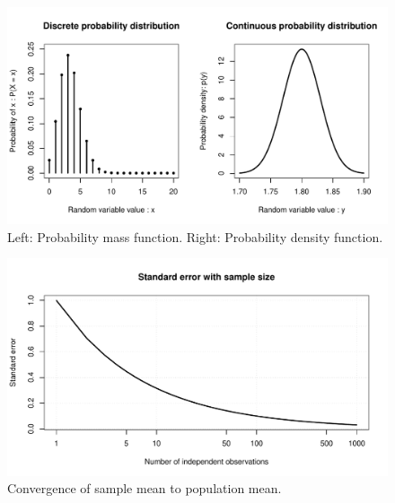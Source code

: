 \documentclass[11pt,a4paper,article]{memoir} %
\begin{document}
\begin{figure}
\includegraphics[width=\textwidth]{probability_distributions.pdf}
\caption{Left: Probability mass function. Right: Probability density function.}
\label{fig:example_pd}
\end{figure}
\begin{figure}
\includegraphics[width=\textwidth]{se_with_sample_size.pdf}
\caption{Convergence of sample mean to population mean.}
\label{fig:se_with_sample_size}
\end{figure}
\par
\end{document}
